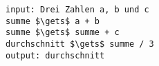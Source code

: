 %
%
\begin{minipage}{\linewidth}
\begin{lstlisting}[language=pseudocode, caption={Algorithmus für das Problem \protect\autoref{problem-durchschnitt-3-zahlen}}]
input: Drei Zahlen a, b und c
summe $\gets$ a + b
summe $\gets$ summe + c
durchschnitt $\gets$ summe / 3
output: durchschnitt
\end{lstlisting}
\end{minipage}
\vfill
